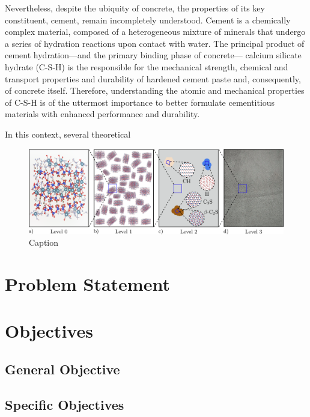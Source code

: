 \documentclass[12pt, titlepage, twoside, openright, usernames, dvipsnames]{thesis}
\theoremstyle{definition}
\theoremstyle{definition}
\begin{document}
  Nevertheless, despite the ubiquity of concrete, the properties of its key constituent, cement, remain incompletely understood. Cement is a chemically complex material, composed of a heterogeneous mixture of minerals that undergo a series of hydration reactions upon contact with water. The principal product of cement hydration---and the primary binding phase of concrete--- calcium silicate hydrate (C-S-H) is the responsible for the mechanical strength, chemical and transport properties and durability of hardened cement paste and, consequently, of concrete itself\cite{Papatzani2015, Ioannidou2016, Qomi2020, Bahraq2022}. Therefore, understanding the atomic and mechanical properties of C-S-H is of the uttermost importance to better formulate cementitious materials with enhanced performance and durability. 

In this context, several theoretical\cite{Barbhuiya2023}

  \begin{figure}[H]
    \centering
    \includegraphics[width=1\textwidth]{levels.png}
    \caption{Caption}
    \label{fig:C-S-H}
  \end{figure}


  \section{Problem Statement}\label{Problem Statement}


  \section{Objectives}\label{Objectives}
  
  \subsection{General Objective}\label{General Objective}

  \subsection{Specific Objectives}\label{Specific Objectives}
\end{document}
